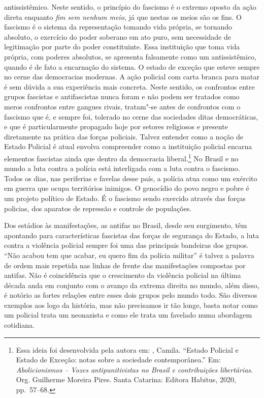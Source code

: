 antissistêmico. Neste sentido, o princípio do fascismo é o extremo
oposto da ação direta enquanto \emph{fim sem nenhum meio,} já que nestas
os meios são os fins. O fascismo é o sistema da representação
tomando vida própria, se tornando absoluto, o exercício do poder
soberano em ato puro, sem necessidade de legitimação por parte do poder
constituinte. Essa instituição que toma vida própria, com poderes
absolutos, se apresenta falsamente como um antissistêmico, quando é de
fato a encarnação do sistema. O estado de exceção que esteve sempre no
cerne das democracias modernas. A ação policial com carta branca para
matar é sem dúvida a sua experiência mais concreta. Neste sentido, os
confrontos entre grupos fascistas e antifascistas nunca foram e não podem
ser tratados como meros confrontos entre gangues rivais, tratam"-se antes
de confrontos com o fascismo que é, e sempre foi, tolerado no cerne das
sociedades ditas democráticas, e que é particularmente propagado hoje
por setores religiosos e presente diretamente na prática das forças
policiais. Talvez entender como a noção de Estado Policial é atual
envolva compreender como a instituição policial encarna elementos
fascistas ainda que dentro da democracia liberal.\footnote{Essa ideia
  foi desenvolvida pela autora em: , Camila. ``Estado Policial e
  Estado de Exceção: notas sobre a sociedade contemporânea.'' Em:
  \emph{Abolicionismos -- Vozes antipunitivistas no Brasil e
  contribuições libertárias}. Org. Guilherme Moreira Pires.
  Santa Catarina: Editora Habitus, 2020, pp.~57--68.} No Brasil e no mundo a luta contra
a polícia está interligada com a luta contra o fascismo. Todos os dias,
nas periferias e favelas desse país, a polícia atua como um exército em
guerra que ocupa territórios inimigos. O genocídio do povo negro e pobre
é um projeto político de Estado. É o fascismo sendo exercido através das
forças policias, dos aparatos de repressão e controle de populações.

Dos estádios às manifestações, as antifas no Brasil, desde seu
surgimento, têm apontando para características fascistas das forças de
segurança do Estado, a luta contra a violência policial sempre foi uma
das principais bandeiras dos grupos. ``Não acabou tem que acabar, eu
quero fim da polícia militar'' é talvez a palavra de ordem mais repetida
nas linhas de frente das manifestações compostas por antifas. Não
é coincidência que o crescimento da violência policial na última década
anda em conjunto com o avanço da extrema direita no mundo, além disso, é
notório as fortes relações entre esses dois grupos pelo mundo todo. São
diversos exemplos aos logo da história, mas não precisamos ir tão longe,
basta notar como um policial trata um neonazista e como ele trata um
favelado numa abordagem cotidiana.

